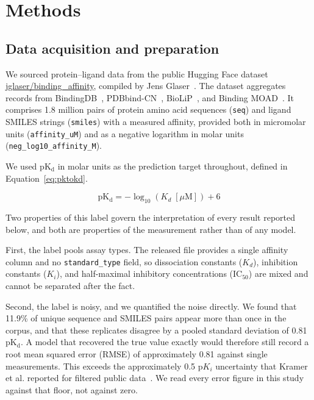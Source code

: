 \documentclass[times, twoside]{zHenriquesLab-StyleBioRxiv}
\newcommand{\pl}{protein--ligand\xspace}
\newcommand{\pkd}{\ensuremath{\mathrm{pK_d}}\xspace}
\begin{document}
\section*{Methods}

\subsection*{Data acquisition and preparation}

We sourced \pl data from the public Hugging Face dataset \href{https://huggingface.co/datasets/jglaser/binding_affinity}{jglaser/binding\_affinity}, compiled by Jens Glaser~\cite{glaser_binding_affinity}. The dataset aggregates records from BindingDB~\cite{gilson2016bindingdb}, PDBbind-CN~\cite{wang2004pdbbind,liu2015pdbbind}, BioLiP~\cite{yang2013biolip}, and Binding MOAD~\cite{hu2005bindingmoad}. It comprises 1.8 million pairs of protein amino acid sequences (\texttt{seq}) and ligand SMILES strings (\texttt{smiles}) with a measured affinity, provided both in micromolar units (\texttt{affinity\_uM}) and as a negative logarithm in molar units (\texttt{neg\_log10\_affinity\_M}).

We used \pkd in molar units as the prediction target throughout, defined in Equation~\ref{eq:pktokd}.

\begin{equation}
\pkd = -\log_{10}\!\left(K_d\;[\mu\mathrm{M}]\right) + 6
\label{eq:pktokd}
\end{equation}

Two properties of this label govern the interpretation of every result reported below, and both are properties of the measurement rather than of any model.

First, the label pools assay types. The released file provides a single affinity column and no \texttt{standard\_type} field, so dissociation constants ($K_d$), inhibition constants ($K_i$), and half-maximal inhibitory concentrations (IC$_{50}$) are mixed and cannot be separated after the fact.

Second, the label is noisy, and we quantified the noise directly. We found that 11.9\% of unique sequence and SMILES pairs appear more than once in the corpus, and that these replicates disagree by a pooled standard deviation of 0.81 \pkd. A model that recovered the true value exactly would therefore still record a root mean squared error (RMSE) of approximately 0.81 against single measurements. This exceeds the approximately 0.5 $\mathrm{p}K_i$ uncertainty that Kramer et al. reported for filtered public data~\cite{kramer2012uncertainty}. We read every error figure in this study against that floor, not against zero.
\end{document}
